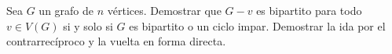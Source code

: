 

\item Sea $G$ un grafo de $n$ vértices. Demostrar que $G - v$ es bipartito para todo $v \in V(G)$ si y solo si $G$ es bipartito o un ciclo impar.  Demostrar la ida por el contrarrecíproco y la vuelta en forma directa.

